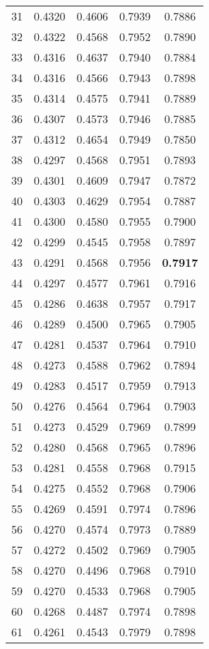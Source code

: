 \documentclass{article}
\begin{document}
\begin{longtable}{c c c c c}
    31 & 0.4320 & 0.4606 & 0.7939 & 0.7886 \\
    32 & 0.4322 & 0.4568 & 0.7952 & 0.7890 \\
    33 & 0.4316 & 0.4637 & 0.7940 & 0.7884 \\
    34 & 0.4316 & 0.4566 & 0.7943 & 0.7898 \\
    35 & 0.4314 & 0.4575 & 0.7941 & 0.7889 \\
    36 & 0.4307 & 0.4573 & 0.7946 & 0.7885 \\
    37 & 0.4312 & 0.4654 & 0.7949 & 0.7850 \\
    38 & 0.4297 & 0.4568 & 0.7951 & 0.7893 \\
    39 & 0.4301 & 0.4609 & 0.7947 & 0.7872 \\
    40 & 0.4303 & 0.4629 & 0.7954 & 0.7887 \\
    41 & 0.4300 & 0.4580 & 0.7955 & 0.7900 \\
    42 & 0.4299 & 0.4545 & 0.7958 & 0.7897 \\
    43 & 0.4291 & 0.4568 & 0.7956 & \bf{0.7917} \\
    44 & 0.4297 & 0.4577 & 0.7961 & 0.7916 \\
    45 & 0.4286 & 0.4638 & 0.7957 & 0.7917 \\
    46 & 0.4289 & 0.4500 & 0.7965 & 0.7905 \\
    47 & 0.4281 & 0.4537 & 0.7964 & 0.7910 \\
    48 & 0.4273 & 0.4588 & 0.7962 & 0.7894 \\
    49 & 0.4283 & 0.4517 & 0.7959 & 0.7913 \\
    50 & 0.4276 & 0.4564 & 0.7964 & 0.7903 \\
    51 & 0.4273 & 0.4529 & 0.7969 & 0.7899 \\
    52 & 0.4280 & 0.4568 & 0.7965 & 0.7896 \\
    53 & 0.4281 & 0.4558 & 0.7968 & 0.7915 \\
    54 & 0.4275 & 0.4552 & 0.7968 & 0.7906 \\
    55 & 0.4269 & 0.4591 & 0.7974 & 0.7896 \\
    56 & 0.4270 & 0.4574 & 0.7973 & 0.7889 \\
    57 & 0.4272 & 0.4502 & 0.7969 & 0.7905 \\
    58 & 0.4270 & 0.4496 & 0.7968 & 0.7910 \\
    59 & 0.4270 & 0.4533 & 0.7968 & 0.7905 \\
    60 & 0.4268 & 0.4487 & 0.7974 & 0.7898 \\
    61 & 0.4261 & 0.4543 & 0.7979 & 0.7898 \\

\end{longtable}
\end{document}
